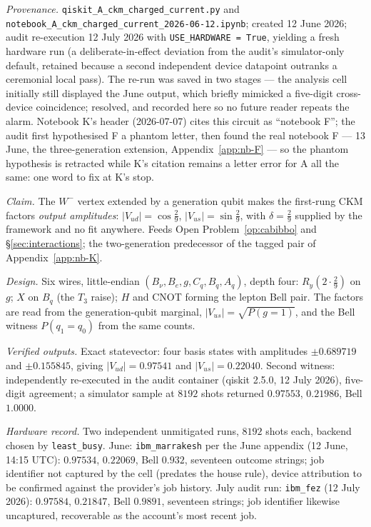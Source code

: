 \emph{Provenance.} \texttt{qiskit\_A\_ckm\_charged\_current.py} and
\texttt{notebook\_A\_ckm\_charged\_current\_2026-06-12.ipynb}; created 12 June 2026; audit
re-execution 12 July 2026 with \texttt{USE\_HARDWARE = True}, yielding a fresh hardware run (a
deliberate-in-effect deviation from the audit's simulator-only default, retained because a second
independent device datapoint outranks a ceremonial local pass). The re-run was saved in two
stages --- the analysis cell initially still displayed the June output, which briefly mimicked a
five-digit cross-device coincidence; resolved, and recorded here so no future reader repeats the
alarm. Notebook K's header (2026-07-07) cites this circuit as ``notebook F''; the audit first
hypothesised F a phantom letter, then found the real notebook F --- 13 June, the three-generation
extension, Appendix~\ref{app:nb-F} --- so the phantom hypothesis is retracted while K's citation
remains a letter error for A all the same: one word to fix at K's stop.

\emph{Claim.} The $W^{-}$ vertex extended by a generation qubit makes the first-rung CKM factors
\emph{output amplitudes}: $\lvert V_{ud}\rvert = \cos\tfrac29$,
$\lvert V_{us}\rvert = \sin\tfrac29$, with $\delta = \tfrac29$ supplied by the framework and no
fit anywhere. Feeds Open Problem~\ref{op:cabibbo} and \S\ref{sec:interactions}; the two-generation
predecessor of the tagged pair of Appendix~\ref{app:nb-K}.

\emph{Design.} Six wires, little-endian $(B_{\nu}, B_{e}, g, C_{q}, B_{q}, A_{q})$, depth four:
$R_{y}(2\cdot\tfrac29)$ on $g$; $X$ on $B_{q}$ (the $T_{3}$ raise); $H$ and CNOT forming the
lepton Bell pair. The factors are read from the generation-qubit marginal,
$\lvert V_{us}\rvert = \sqrt{P(g{=}1)}$, and the Bell witness $P(q_{1}{=}q_{0})$ from the same
counts.

\emph{Verified outputs.} Exact statevector: four basis states with amplitudes $\pm 0.689719$ and
$\pm 0.155845$, giving $\lvert V_{ud}\rvert = 0.97541$ and $\lvert V_{us}\rvert = 0.22040$.
Second witness: independently re-executed in the audit container (qiskit 2.5.0, 12 July 2026),
five-digit agreement; a simulator sample at $8192$ shots returned $0.97553$, $0.21986$, Bell
$1.0000$.

\emph{Hardware record.} Two independent unmitigated runs, $8192$ shots each, backend chosen by
\texttt{least\_busy}. June: \texttt{ibm\_marrakesh} per the June appendix (12 June, 14:15 UTC):
$0.97534$, $0.22069$, Bell $0.932$, seventeen outcome strings; job identifier not captured by the
cell (predates the house rule), device attribution to be confirmed against the provider's job
history. July audit run: \texttt{ibm\_fez} (12 July 2026): $0.97584$, $0.21847$, Bell $0.9891$,
seventeen strings; job identifier likewise uncaptured, recoverable as the account's most recent
job.


